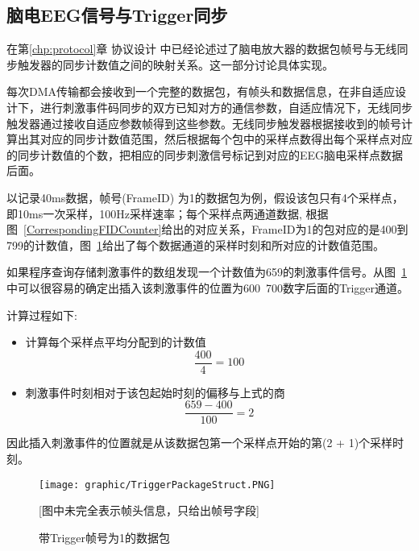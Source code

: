 \subsection{脑电EEG信号与Trigger同步\label{EEGSynTrigger}}

	在第\ref{chp:protocol}章 协议设计 中已经论述过了脑电放大器的数据包帧号与无线同步触发器的同步计数值之间的映射关系。这一部分讨论具体实现。

	每次DMA传输都会接收到一个完整的数据包，有帧头和数据信息，在非自适应设计下，进行刺激事件码同步的双方已知对方的通信参数，自适应情况下，无线同步触发器通过接收自适应参数帧得到这些参数。无线同步触发器根据接收到的帧号计算出其对应的同步计数值范围，然后根据每个包中的采样点数得出每个采样点对应的同步计数值的个数，把相应的同步刺激信号标记到对应的EEG脑电采样点数据后面。

	以记录40ms数据，帧号(FrameID) 为1的数据包为例，假设该包只有4个采样点，即10ms一次采样，100Hz采样速率；每个采样点两通道数据, 根据图~\ref{CorrespondingFIDCounter}给出的对应关系，FrameID为1的包对应的是400到799的计数值，图~\ref{TriggerPackage1}给出了每个数据通道的采样时刻和所对应的计数值范围。

如果程序查询存储刺激事件的数组发现一个计数值为659的刺激事件信号。从图~\ref{TriggerPackage1}中可以很容易的确定出插入该刺激事件的位置为600~700数字后面的Trigger通道。

计算过程如下:
\begin{itemize}
\item 计算每个采样点平均分配到的计数值
\begin{equation}
	\frac{400}{4} = 100
\end{equation}
\item 刺激事件时刻相对于该包起始时刻的偏移与上式的商
\begin{equation}
	\frac{659 - 400}{ 100 } = 2 
\end{equation}
\end{itemize}

因此插入刺激事件的位置就是从该数据包第一个采样点开始的第(2 + 1)个采样时刻。

\begin{figure}[!hbp]
\begin{center}
\texttt{[image: graphic/TriggerPackageStruct.PNG]}
\caption{带Trigger帧号为1的数据包 \label{TriggerPackage1}}
[图中未完全表示帧头信息，只给出帧号字段]
\end{center}
\end{figure}

